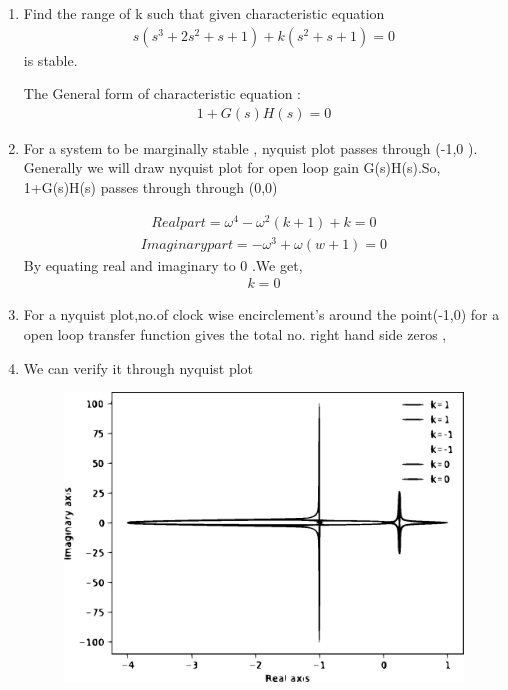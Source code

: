 \begin{enumerate}[label=\thesection.\arabic*.,ref=\thesection.\theenumi]
\item Find the range of k such that given characteristic equation
\begin{align}
s(s^3+2s^2+s+1) +k(s^2+s+1) = 0
\label{eq:ee18btech11042_1}
\end{align}
is stable.

\solution
The General form of characteristic equation :
\begin{align}
1+G(s)H(s) = 0
\label{eq:ee18btech11042_2}    
\end{align}
\item For a system to be marginally stable , nyquist plot passes through (-1,0 ). Generally we will draw nyquist plot for open loop gain G(s)H(s).So, 1+G(s)H(s) passes through through (0,0)

\begin{align}
Real part = \omega^4 - \omega^2(k+1) +k = 0
\label{eq:ee18btech11042_3}
\end{align}
\begin{align}
Imaginary part = -\omega^3 +\omega(w+1) = 0
\label{eq:ee18btech11042_4}
\end{align}
By equating real and imaginary to 0 .We get,
\begin{align}
k = 0
\label{eq:ee18btech11042_5}
\end{align}

\item For a nyquist plot,no.of clock wise encirclement's around the point(-1,0) for a open loop transfer function gives the total no. right hand side  zeros ,
\item We can verify it through nyquist plot

\begin{figure}[!h]
  \includegraphics[width=\columnwidth]{ee18btech11042_1.eps}
  \label{fig:ee18btech11042_1.eps}
\end{figure}



\end{enumerate}
